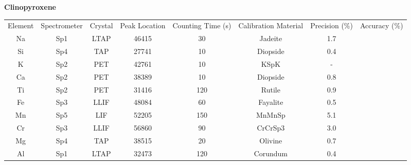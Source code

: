 \begin{table}[!htbp]
\begin{subtable}[h]{1\textwidth}
\centering
\small \textbf{Clinopyroxene} \\ 
\vspace{5pt}
\begin{adjustbox}{width=1\textwidth, center=\textwidth}
\begin{tabular}{c c c c c c c c}
\hline 
\multirow{3}{*}{Element} & \multirow{3}{*}{Spectrometer} & \multirow{3}{*}{Crystal} & \multirow{3}{*}{Peak Location} & \multirow{3}{2cm}{\centering Counting Time (s)}  & \multirow{3}{2cm}{\centering Calibration Material} & \multirow{3}{*}{Precision (\%)} & \multirow{3}{*}{Accuracy (\%)}\\ 
\\ 
\\
\hline
Na & Sp1 & LTAP & 46415 & 30 & Jadeite & 1.7 &  \\
Si & Sp4 & TAP & 27741 & 10 & Diopside & 0.4&  \\
K & Sp2 & PET & 42761 & 10 & KSpK & - &  \\
Ca & Sp2 & PET & 38389 & 10 & Diopside & 0.8 &  \\
Ti & Sp2 & PET & 31416 & 120 & Rutile & 0.9 &  \\
Fe & Sp3 & LLIF & 48084 & 60 & Fayalite & 0.5 &  \\
Mn & Sp5 & LIF & 52205 & 150 & MnMnSp & 5.1 &  \\
Cr & Sp3 & LLIF & 56860 & 90 & CrCrSp3 & 3.0 &  \\
Mg & Sp4 & TAP & 38515 & 20 & Olivine & 0.7 &  \\
Al & Sp1 & LTAP & 32473 & 120 & Corundum & 0.4 &  \\
\hline 
\end{tabular}
\end{adjustbox}
\vspace{3pt}
\end{subtable}


\end{table}

